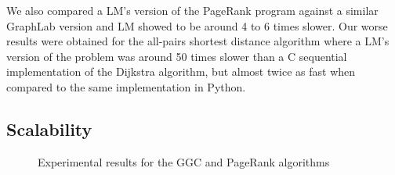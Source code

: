 We also compared a LM's version of the PageRank program against a
similar GraphLab version and LM showed to be around 4 to 6 times
slower. Our worse results were obtained for the all-pairs shortest
distance algorithm where a LM's version of the problem was around 50
times slower than a C sequential implementation of the Dijkstra
algorithm, but almost twice as fast when compared to the same
implementation in Python.


\subsection{Scalability}

\begin{figure}[ht]
\centering
{}
\hspace{0.5cm}
\caption{Experimental results for the GGC and PageRank algorithms}
\end{figure}

